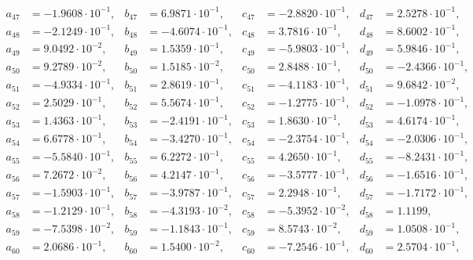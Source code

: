 \begin{align*}
  a_{ 47 } &= -1.9608 \cdot 10^{ -1 }, & b_{ 47 } &= 6.9871 \cdot 10^{ -1 }, & c_{ 47 } &= -2.8820 \cdot 10^{ -1 }, & d_{ 47 } &= 2.5278 \cdot 10^{ -1 }, \\ 
  a_{ 48 } &= -2.1249 \cdot 10^{ -1 }, & b_{ 48 } &= -4.6074 \cdot 10^{ -1 }, & c_{ 48 } &= 3.7816 \cdot 10^{ -1 }, & d_{ 48 } &= 8.6002 \cdot 10^{ -1 }, \\ 
  a_{ 49 } &= 9.0492 \cdot 10^{ -2 }, & b_{ 49 } &= 1.5359 \cdot 10^{ -1 }, & c_{ 49 } &= -5.9803 \cdot 10^{ -1 }, & d_{ 49 } &= 5.9846 \cdot 10^{ -1 }, \\ 
  a_{ 50 } &= 9.2789 \cdot 10^{ -2 }, & b_{ 50 } &= 1.5185 \cdot 10^{ -2 }, & c_{ 50 } &= 2.8488 \cdot 10^{ -1 }, & d_{ 50 } &= -2.4366 \cdot 10^{ -1 }, \\ 
  a_{ 51 } &= -4.9334 \cdot 10^{ -1 }, & b_{ 51 } &= 2.8619 \cdot 10^{ -1 }, & c_{ 51 } &= -4.1183 \cdot 10^{ -1 }, & d_{ 51 } &= 9.6842 \cdot 10^{ -2 }, \\ 
  a_{ 52 } &= 2.5029 \cdot 10^{ -1 }, & b_{ 52 } &= 5.5674 \cdot 10^{ -1 }, & c_{ 52 } &= -1.2775 \cdot 10^{ -1 }, & d_{ 52 } &= -1.0978 \cdot 10^{ -1 }, \\ 
  a_{ 53 } &= 1.4363 \cdot 10^{ -1 }, & b_{ 53 } &= -2.4191 \cdot 10^{ -1 }, & c_{ 53 } &= 1.8630 \cdot 10^{ -1 }, & d_{ 53 } &= 4.6174 \cdot 10^{ -1 }, \\ 
  a_{ 54 } &= 6.6778 \cdot 10^{ -1 }, & b_{ 54 } &= -3.4270 \cdot 10^{ -1 }, & c_{ 54 } &= -2.3754 \cdot 10^{ -1 }, & d_{ 54 } &= -2.0306 \cdot 10^{ -1 }, \\ 
  a_{ 55 } &= -5.5840 \cdot 10^{ -1 }, & b_{ 55 } &= 6.2272 \cdot 10^{ -1 }, & c_{ 55 } &= 4.2650 \cdot 10^{ -1 }, & d_{ 55 } &= -8.2431 \cdot 10^{ -1 }, \\ 
  a_{ 56 } &= 7.2672 \cdot 10^{ -2 }, & b_{ 56 } &= 4.2147 \cdot 10^{ -1 }, & c_{ 56 } &= -3.5777 \cdot 10^{ -1 }, & d_{ 56 } &= -1.6516 \cdot 10^{ -1 }, \\ 
  a_{ 57 } &= -1.5903 \cdot 10^{ -1 }, & b_{ 57 } &= -3.9787 \cdot 10^{ -1 }, & c_{ 57 } &= 2.2948 \cdot 10^{ -1 }, & d_{ 57 } &= -1.7172 \cdot 10^{ -1 }, \\ 
  a_{ 58 } &= -1.2129 \cdot 10^{ -1 }, & b_{ 58 } &= -4.3193 \cdot 10^{ -2 }, & c_{ 58 } &= -5.3952 \cdot 10^{ -2 }, & d_{ 58 } &= 1.1199, \\ 
  a_{ 59 } &= -7.5398 \cdot 10^{ -2 }, & b_{ 59 } &= -1.1843 \cdot 10^{ -1 }, & c_{ 59 } &= 8.5743 \cdot 10^{ -2 }, & d_{ 59 } &= 1.0508 \cdot 10^{ -1 }, \\ 
  a_{ 60 } &= 2.0686 \cdot 10^{ -1 }, & b_{ 60 } &= 1.5400 \cdot 10^{ -2 }, & c_{ 60 } &= -7.2546 \cdot 10^{ -1 }, & d_{ 60 } &= 2.5704 \cdot 10^{ -1 }, \\ 

\end{align*}

